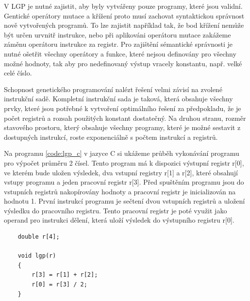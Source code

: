 V LGP je nutné zajistit, aby byly vytvářeny pouze programy, které jsou validní.
Gentické operátory mutace a křížení proto musí zachovat syntaktickou správnost nově vytvořených programů.
To lze zajistit například tak, že bod křížení nemůže být určen urvnitř instrukce, nebo při aplikováni operátoru mutace zakážeme záměnu operátoru instrukce za registr.
Pro zajištění sémantické správnosti je nutné ošetřit všechny operátory a funkce, které nejsou definovány pro všechny možné hodnoty, tak aby pro nedefinovaný výstup vracely konstantu, např. velké celé číslo.

Schopnost genetického programování nalézt řešení velmi závisí na zvolené instrukční sadě.
Kompletní instrukční sada je taková, která obsahuje všechny prvky, které jsou potřebné k vytvoření optimálního řešení za předpokladu, že je počet registrů a rozsah použitých konstant dostatečný.
Na druhou stranu, rozměr stavového prostoru, který obsahuje všechny programy, které je možné sestavit z dostupných instrukcí, roste exponenciálně s počtem instrukcí a registrů.

Na programu \ref{code:lgp_c} v jazyce C si ukážeme průběh vykonávání programu pro výpočet průměru 2 čísel.
Tento program má k dispozici výstupní registr r[0], ve kterém bude uložen výsledek, dva vstupní registry r[1] a r[2], které obsahují vstupy programu a jeden pracovní registr r[3].
Před spuštěním programu jsou do vstupních registrů nakopírovány hodnoty a pracovní registr je inicializován na hodnotu 1.
První instrukcí programu je sečtení dvou vstupních registrů a uložení výsledku do pracovního registru.
Tento pracovní registr je poté využit jako operand pro instrukci dělení, která uloží výsledek do výstupního registru r[0].



\begin{lstlisting}
    double r[4];

    void lgp(r)
    {
        r[3] = r[1] + r[2];
        r[0] = r[3] / 2;
    }
\end{lstlisting}


